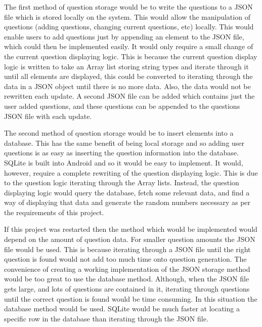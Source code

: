 \documentclass{article}
\begin{document}
The first method of question storage would be to write the questions to a JSON file which is stored locally on the system. This would allow the manipulation of questions (adding questions, changing current questions, etc) locally. This would enable users to add questions just by appending an element to the JSON file, which could then be implemented easily. It would only require a small change of the current question displaying logic. This is because the current question display logic is written to take an Array list storing string types and iterate through it until all elements are displayed, this could be converted to iterating through the data in a JSON object until there is no more data. Also, the data would not be rewritten each update. A second JSON file can be added which contains just the user added questions, and these questions can be appended to the questions JSON file with each update. \par

The second method of question storage would be to insert elements into a database. This has the same benefit of being local storage and so adding user questions is as easy as inserting the question information into the database. SQLite is built into Android and so it would be easy to implement. It would, however, require a complete rewriting of the question displaying logic. This is due to the question logic iterating through the Array lists. Instead, the question displaying logic would query the database, fetch some relevant data, and find a way of displaying that data and generate the random numbers necessary as per the requirements of this project. \par

If this project was restarted then the method which would be implemented would depend on the amount of question data. For smaller question amounts the JSON file would be used. This is because iterating through a JSON file until the right question is found would not add too much time onto question generation. The convenience of creating a working implementation of the JSON storage method would be too great to use the database method. Although, when the JSON file gets large, and lots of questions are contained in it, iterating through questions until the correct question is found would be time consuming. In this situation the database method would be used. SQLite would be much faster at locating a specific row in the database than iterating through the JSON file. \par
\end{document}
